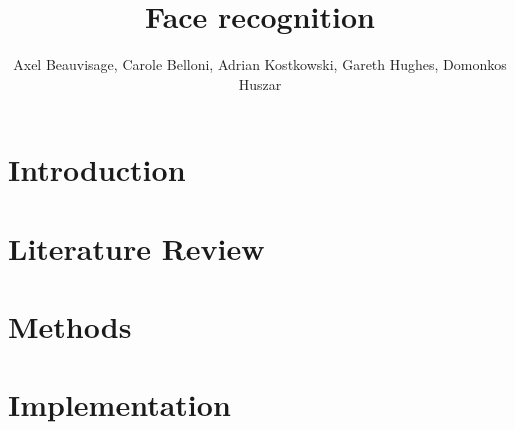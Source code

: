 \documentclass[journal]{IEEEtran}
\begin{document}
%
\title{Face recognition}

\author{Axel Beauvisage, Carole Belloni, Adrian Kostkowski, Gareth Hughes, Domonkos Huszar}


\maketitle


\begin{abstract}


\end{abstract}


\IEEEpeerreviewmaketitle
\section{Introduction}


\section{Literature Review}


\section {Methods}


\section {Implementation}

\end{document}

